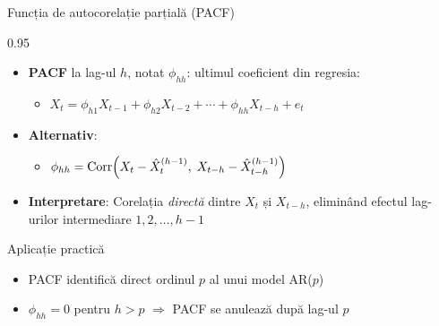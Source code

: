 \documentclass[9pt, aspectratio=169, t]{beamer}
\begin{document}
\begin{frame}{Funcția de autocorelație parțială (PACF)}
    \begin{cminipage}{0.95\textwidth}
        \begin{defn}
            \begin{itemize}\setlength{\itemsep}{0pt}
                \item \textbf{PACF} la lag-ul $h$, notat $\phi_{hh}$: ultimul coeficient din regresia:
                \begin{itemize}
                    \item $X_t = \phi_{h1}X_{t-1} + \phi_{h2}X_{t-2} + \cdots + \phi_{hh}X_{t-h} + e_t$
                \end{itemize}
                \item \textbf{Alternativ}:
                \begin{itemize}
                    \item $\phi_{hh} = \text{Corr}\!\left(X_t - \hat{X}_t^{(h-1)},\; X_{t-h} - \hat{X}_{t-h}^{(h-1)}\right)$
                \end{itemize}
                \item \textbf{Interpretare}: Corelația \textit{directă} dintre $X_t$ și $X_{t-h}$, eliminând efectul lag-urilor intermediare $1, 2, \ldots, h-1$
            \end{itemize}
        \end{defn}

        \begin{exampleblock}{Aplicație practică}
            \begin{itemize}\setlength{\itemsep}{0pt}
                \item PACF identifică direct ordinul $p$ al unui model AR($p$)
                \item $\phi_{hh} = 0$ pentru $h > p$ $\Rightarrow$ PACF se anulează după lag-ul $p$
            \end{itemize}
        \end{exampleblock}
    \end{cminipage}
\end{frame}
\end{document}

